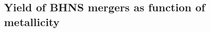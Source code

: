\documentclass[twocolumn]{aastex63}
\newcommand\bhnsSingle{BHNS\xspace}
\begin{document}




 
 
 
 \subsection{Yield of \bhnsSingle mergers as function of metallicity}
%
\end{document}
